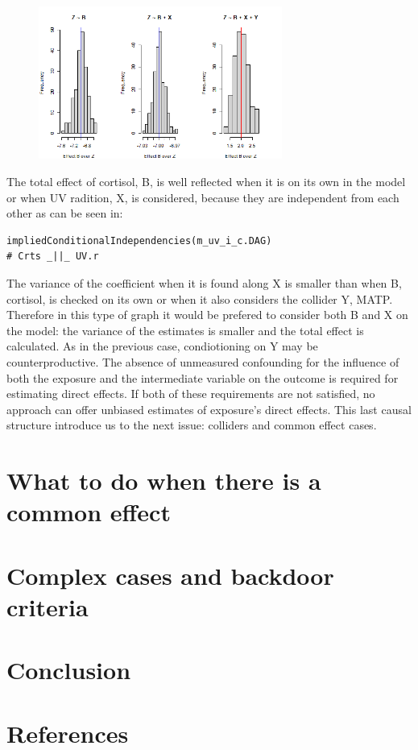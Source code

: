 \documentclass{article}
\begin{document}
\begin{figure}[h]
\includegraphics[width=8cm]{histextraoverY.png}
\centering
\end{figure}
The total effect of cortisol, B, is well reflected when it is on its own in the model or when UV radition, X, is considered, because they are independent from each other as can be seen in:
\begin{lstlisting}
impliedConditionalIndependencies(m_uv_i_c.DAG)
# Crts _||_ UV.r
\end{lstlisting}
The variance of the coefficient when it is found along X is smaller than when B, cortisol, is checked on its own or when it also considers the collider Y, MATP.
Therefore in this type of graph it would be prefered to consider both B and X on the model: the variance of the estimates is smaller and the total effect is calculated. As in the previous case, condiotioning on Y may be counterproductive. 
The absence of unmeasured confounding for the influence of both the exposure and the intermediate variable on the outcome is required for estimating direct effects. If both of these requirements are not satisfied, no approach can offer unbiased estimates of exposure's direct effects.
This last causal structure introduce us to the next issue: colliders and common effect cases.
\newpage
\section{What to do when there is a common effect}

\section{Complex cases and backdoor criteria}

\section{Conclusion}

\section{References}
\end{document}
